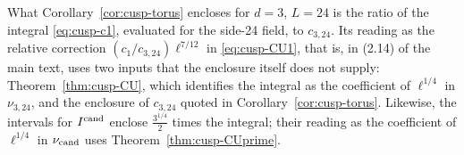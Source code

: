 \begin{remark}\label{rem:cusp-reading}
What Corollary~\ref{cor:cusp-torus} encloses for $d=3$, $L=24$ is the ratio of the integral \eqref{eq:cusp-c1}, evaluated for the side-24 field, to $c_{3,24}$. Its reading as the relative correction $(c_1/c_{3,24})\ell^{7/12}$ in \eqref{eq:cusp-CU1}, that is, in (2.14) of the main text, uses two inputs that the enclosure itself does not supply: Theorem~\ref{thm:cusp-CU}, which identifies the integral as the coefficient of $\ell^{1/4}$ in $\nu_{3,24}$, and the enclosure of $c_{3,24}$ quoted in Corollary~\ref{cor:cusp-torus}. Likewise, the intervals for $I^{\mathrm{cand}}$ enclose $\frac{3^{1/4}}2$ times the integral; their reading as the coefficient of $\ell^{1/4}$ in $\nu_{\mathrm{cand}}$ uses Theorem~\ref{thm:cusp-CUprime}.
\end{remark}
